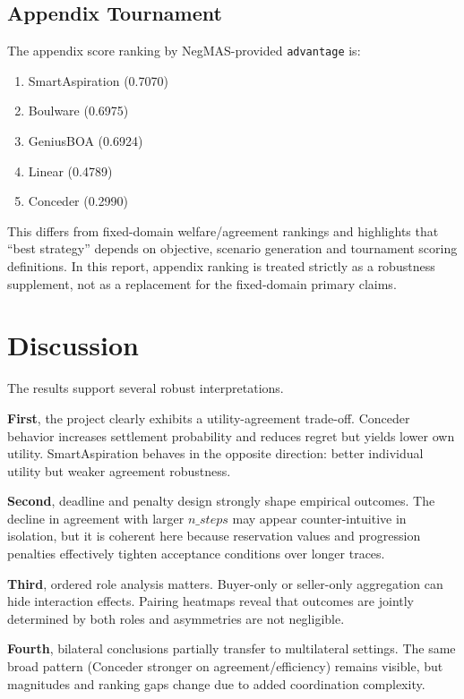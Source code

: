 \documentclass[11pt]{article}
\begin{document}
\subsection{Appendix Tournament}
The appendix score ranking by NegMAS-provided \texttt{advantage} is:
\begin{enumerate}[leftmargin=1.5em]
    \item SmartAspiration (0.7070)
    \item Boulware (0.6975)
    \item GeniusBOA (0.6924)
    \item Linear (0.4789)
    \item Conceder (0.2990)
\end{enumerate}
This differs from fixed-domain welfare/agreement rankings and highlights that ``best strategy'' depends on objective, scenario generation and tournament scoring definitions. In this report, appendix ranking is treated strictly as a robustness supplement, not as a replacement for the fixed-domain primary claims.

\section{Discussion}
The results support several robust interpretations.

\textbf{First}, the project clearly exhibits a utility-agreement trade-off. Conceder behavior increases settlement probability and reduces regret but yields lower own utility. SmartAspiration behaves in the opposite direction: better individual utility but weaker agreement robustness.

\textbf{Second}, deadline and penalty design strongly shape empirical outcomes. The decline in agreement with larger \(n\_steps\) may appear counter-intuitive in isolation, but it is coherent here because reservation values and progression penalties effectively tighten acceptance conditions over longer traces.

\textbf{Third}, ordered role analysis matters. Buyer-only or seller-only aggregation can hide interaction effects. Pairing heatmaps reveal that outcomes are jointly determined by both roles and asymmetries are not negligible.

\textbf{Fourth}, bilateral conclusions partially transfer to multilateral settings. The same broad pattern (Conceder stronger on agreement/efficiency) remains visible, but magnitudes and ranking gaps change due to added coordination complexity.
\end{document}
